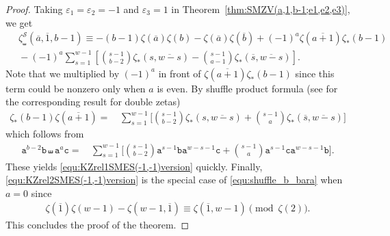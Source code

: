 \documentclass{article}
\newcommand{\sha}{\shuffle}
\newcommand{\Sy}{{\mathcal S}}
\newcommand\ta{{\texttt{a}}}
\newcommand\tb{{\texttt{b}}}
\newcommand\tc{{\texttt{c}}}
\newcommand\eps{{\varepsilon}}
\newcommand{\ol}{\overline}
\theoremstyle{plain}
\theoremstyle{definition}
\begin{document}
\begin{proof}
Taking $\eps_1=\eps_2=-1$ and $\eps_3=1$ in  Theorem~\ref{thm:SMZV(a,1,b-1;e1,e2,e3)}, we get
\begin{align*}
&\,  \zeta_\sha^\Sy(\ol{a},\ol{1},b-1)
\equiv   -(b-1)\zeta(\ol{a})\zeta(b)-\zeta(\ol{a})\zeta(\ol{b})+ (-1)^a\zeta(\ol{a+1})\zeta_*(b-1) \\
&\,-(-1)^{a}\sum_{s=1}^{w-1}\left[ \binom{s-1}{b-2} \zeta_*(s,\ol{w-s}) -\binom{s-1}{a-1}\zeta_*(\ol{s},\ol{w-s})\right] .
\end{align*}
Note that we multiplied by $(-1)^a$ in front of $\zeta(\ol{a+1})\zeta_*(b-1)$ since this term could be nonzero only when $a$ is even. By shuffle product formula (see \cite[(3)]{GanglKaZa2006} for the corresponding result for double zetas)
\begin{align}\label{equ:shuffle_b_bara}
\zeta_*(b-1)\zeta(\ol{a+1})=&\, \sum_{s=1}^{w-1} \bigg[\binom{s-1}{b-2}\zeta_*(s,\ol{w-s}) +\binom{s-1}{a}\zeta_*(\ol{s},\ol{w-s})\bigg]
\end{align}
which follows from
\begin{align*}
\ta^{b-2}\tb \sha \ta^a\tc =&\, \sum_{s=1}^{w-1} \bigg[\binom{s-1}{b-2}\ta^{s-1}\tb \ta^{w-s-1}\tc +\binom{s-1}{a} \ta^{s-1}\tc\ta^{w-s-1}\tb\bigg]  .
\end{align*}
These yields \eqref{equ:KZrel1SMES(-1,-1)version} quickly. Finally, \eqref{equ:KZrel2SMES(-1,-1)version} is the special case of \eqref{equ:shuffle_b_bara} when $a=0$ since
\begin{align*}
\zeta(\ol{1})\zeta(w-1)-\zeta(w-1,\ol{1})\equiv \zeta(\ol{1},w-1) \pmod{\zeta(2)}.
\end{align*}
This concludes the proof of the theorem.
\end{proof}
\end{document}
